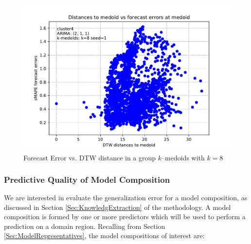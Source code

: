 \begin{figure}[h]
	\centering
	\includegraphics[scale=0.5]{../Figures/auto_arima_distance_error_whole_brazil_1y_1ppd_k8_seed1_cluster4_pdq2-1-1_sMAPE}
	\caption{Forecast Error vs. DTW distance in a group $k$--medoids with $k=8$}
	\label{Fig:DTWvsForecastError}
\end{figure}

\subsubsection{Predictive Quality of Model Composition}
\label{Sec:ModelComposition}

We are interested in evaluate the generalization error for a model composition, as discussed in Section \ref{Sec:KnowledgExtraction} of the methodology. A model composition is formed by one or more predictors which will be used to perform a prediction on a domain region. Recalling from Section \ref{Sec:ModelRepresentatives}, the model compositions of interest are:

